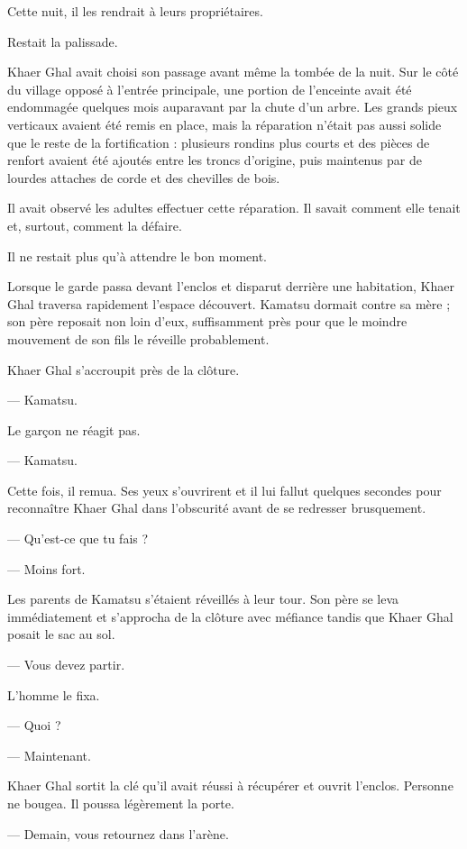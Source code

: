 Cette nuit, il les rendrait à leurs propriétaires.

Restait la palissade.

Khaer Ghal avait choisi son passage avant même la tombée de la nuit. Sur le
côté du village opposé à l'entrée principale, une portion de l'enceinte avait
été endommagée quelques mois auparavant par la chute d'un arbre. Les grands
pieux verticaux avaient été remis en place, mais la réparation n'était pas
aussi solide que le reste de la fortification : plusieurs rondins plus courts
et des pièces de renfort avaient été ajoutés entre les troncs d'origine, puis
maintenus par de lourdes attaches de corde et des chevilles de bois.

Il avait observé les adultes effectuer cette réparation. Il savait comment
elle tenait et, surtout, comment la défaire.

Il ne restait plus qu'à attendre le bon moment.

\scenebreak

Lorsque le garde passa devant l'enclos et disparut derrière une habitation,
Khaer Ghal traversa rapidement l'espace découvert. Kamatsu dormait contre sa
mère ; son père reposait non loin d'eux, suffisamment près pour que le moindre
mouvement de son fils le réveille probablement.

Khaer Ghal s'accroupit près de la clôture.

— Kamatsu.

Le garçon ne réagit pas.

— Kamatsu.

Cette fois, il remua. Ses yeux s'ouvrirent et il lui fallut quelques secondes
pour reconnaître Khaer Ghal dans l'obscurité avant de se redresser
brusquement.

— Qu'est-ce que tu fais ?

— Moins fort.

Les parents de Kamatsu s'étaient réveillés à leur tour. Son père se leva
immédiatement et s'approcha de la clôture avec méfiance tandis que Khaer Ghal
posait le sac au sol.

— Vous devez partir.

L'homme le fixa.

— Quoi ?

— Maintenant.

Khaer Ghal sortit la clé qu'il avait réussi à récupérer et ouvrit l'enclos.
Personne ne bougea. Il poussa légèrement la porte.

— Demain, vous retournez dans l'arène.

